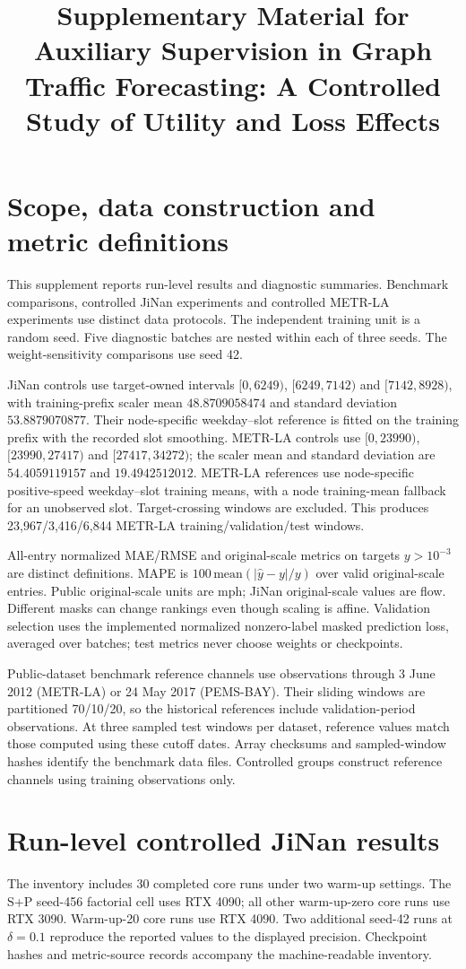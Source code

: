 \documentclass[a4paper,10pt]{article}
\title{Supplementary Material for\\Auxiliary Supervision in Graph Traffic Forecasting: A Controlled Study of Utility and Loss Effects}
\author{}\date{}
\begin{document}
\maketitle
\section{Scope, data construction and metric definitions}
This supplement reports run-level results and diagnostic summaries. Benchmark comparisons, controlled JiNan experiments and controlled METR-LA experiments use distinct data protocols. The independent training unit is a random seed. Five diagnostic batches are nested within each of three seeds. The weight-sensitivity comparisons use seed 42.

JiNan controls use target-owned intervals $[0,6249)$, $[6249,7142)$ and $[7142,8928)$, with training-prefix scaler mean $48.8709058474$ and standard deviation $53.8879070877$. Their node-specific weekday--slot reference is fitted on the training prefix with the recorded slot smoothing. METR-LA controls use $[0,23990)$, $[23990,27417)$ and $[27417,34272)$; the scaler mean and standard deviation are $54.4059119157$ and $19.4942512012$. METR-LA references use node-specific positive-speed weekday--slot training means, with a node training-mean fallback for an unobserved slot. Target-crossing windows are excluded. This produces 23,967/3,416/6,844 METR-LA training/validation/test windows.

All-entry normalized MAE/RMSE and original-scale metrics on targets $y>10^{-3}$ are distinct definitions. MAPE is $100\,\mathrm{mean}(|\hat y-y|/y)$ over valid original-scale entries. Public original-scale units are mph; JiNan original-scale values are flow. Different masks can change rankings even though scaling is affine. Validation selection uses the implemented normalized nonzero-label masked prediction loss, averaged over batches; test metrics never choose weights or checkpoints.

Public-dataset benchmark reference channels use observations through 3 June 2012 (METR-LA) or 24 May 2017 (PEMS-BAY). Their sliding windows are partitioned 70/10/20, so the historical references include validation-period observations. At three sampled test windows per dataset, reference values match those computed using these cutoff dates. Array checksums and sampled-window hashes identify the benchmark data files. Controlled groups construct reference channels using training observations only.

\section{Run-level controlled JiNan results}
The inventory includes 30 completed core runs under two warm-up settings. The S+P seed-456 factorial cell uses RTX 4090; all other warm-up-zero core runs use RTX 3090. Warm-up-20 core runs use RTX 4090. Two additional seed-42 runs at $\delta=0.1$ reproduce the reported values to the displayed precision. Checkpoint hashes and metric-source records accompany the machine-readable inventory.
\end{document}
